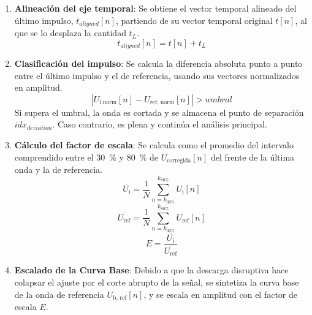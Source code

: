 \begin{enumerate}
    \begin{equation}
        t_L = \frac{\left( t_{30, \text{ref}} - t_{30, \text{i}} \right) + \left( t_{50, \text{ref}} - t_{50, \text{i}} \right) + \left( t_{80, \text{ref}} - t_{80, \text{i}} \right)}{3} 
    \end{equation}
    \item \textbf{Alineación del eje temporal}: Se obtiene el vector temporal alineado del último impulso, $t_{aligned}[n]$, partiendo de su vector temporal original $t[n]$, al que se lo desplaza la cantidad $t_L$.
    \begin{equation}
        \label{eq:eje_alineado}
        t_{aligned}[n] = t[n] + t_L
    \end{equation}
    \item \textbf{Clasificación del impulso}: Se calcula la diferencia absoluta punto a punto entre el último impulso y el de referencia, usando sus vectores normalizados en amplitud.
    \begin{equation}
        \label{eq:umbral_desviacion}
        | U_{\text{i,norm}}[n] - U_{\text{ref, norm}}[n] | > umbral
    \end{equation}
    Si supera el umbral, la onda es cortada y se almacena el punto de separación $idx_{deviation}$. Caso contrario, es plena y continúa el análisis principal.
        \item \textbf{Cálculo del factor de escala}: Se calcula como el promedio del intervalo comprendido entre el \qty{30}{\percent} y \qty{80}{\percent} de $U_{\text{corregida}}[n]$ del frente de la última onda y la de referencia.
    \begin{equation}
        \overline{U_\text{i}} = \frac{1}{N} \sum_{n = k_{30\%}}^{k_{80\%}} U_\text{i}[n]
    \end{equation}
    \begin{equation}
        \overline{U_\text{ref}} = \frac{1}{N} \sum_{n = k_{30\%}}^{k_{80\%}} U_\text{ref}[n]
    \end{equation}
    \begin{equation}
        \label{eq:factor_escala_e}
        E = \frac{\overline{U_\text{i}}}{\overline{U_\text{ref}}}
    \end{equation}
    \item \textbf{Escalado de la Curva Base}: Debido a que la descarga disruptiva hace colapsar el ajuste por el corte abrupto de la señal, se sintetiza la curva base de la onda de referencia $U_\text{b, ref}[n]$, y se escala en amplitud con el factor de escala $E$.
    \begin{equation}

\end{equation}
\end{enumerate}
